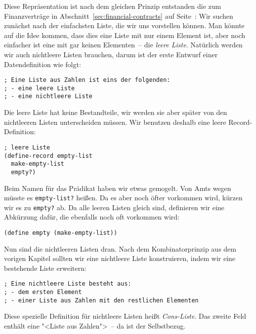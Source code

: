 Diese Repräsentation ist nach dem gleichen Prinzip entstanden die zum
Finanzverträge in Abschnitt~\ref{sec:financial-contracts} auf
Seite~\pageref{sec:financial-contracts}: Wir suchen zunächst nach der
einfachsten Liste, die wir uns vorstellen können.  Man könnte auf die
Idee kommen, dass dies eine Liste mit nur einem Element ist, aber noch
einfacher ist eine mit gar keinen Elementen~-- die \textit{leere
  Liste}.  Natürlich werden
wir auch nichtleere Listen brauchen, darum ist der erste Entwurf
einer Datendefinition wie folgt:
%
\begin{lstlisting}
; Eine Liste aus Zahlen ist eins der folgenden:
; - eine leere Liste
; - eine nichtleere Liste
\end{lstlisting}
%
Die leere Liste hat keine Bestandteile, wir werden sie
aber später von den nichtleeren Listen unterscheiden müssen.  Wir
benutzen deshalb eine leere Record-Definition:
%
\begin{lstlisting}
; leere Liste
(define-record empty-list
  make-empty-list
  empty?)
\end{lstlisting}
%
Beim Namen für das Prädikat haben wir etwas gemogelt.  Von Amts wegen
müsste es \lstinline{empty-list?} heißen.  Da es aber noch öfter
vorkommen wird, kürzen wir es zu \lstinline{empty?} ab. Da alle leeren
Listen gleich sind, definieren wir eine Abkürzung dafür, die ebenfalls
noch oft vorkommen wird:
%
\begin{lstlisting}
(define empty (make-empty-list))
\end{lstlisting}
%
Nun sind die nichtleeren Listen dran.  Nach dem Kombinatorprinzip aus dem
vorigen Kapitel sollten wir eine nichtleere Liste konstruieren, indem
wir eine bestehende Liste erweitern:
%
\begin{lstlisting}
; Eine nichtleere Liste besteht aus:
; - dem ersten Element
; - einer Liste aus Zahlen mit den restlichen Elementen
\end{lstlisting}
%
Diese spezielle Definition für nichtleere Listen heißt
\textit{Cons-Liste}.  Das zweite Feld enthält
eine "<Liste aus Zahlen">~-- da ist der Selbstbezug.

